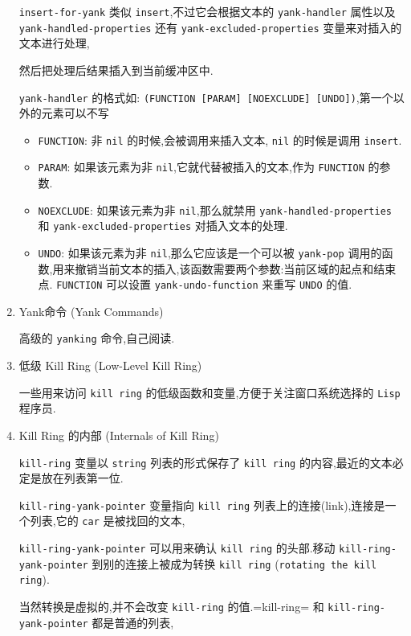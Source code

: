 \documentclass[11pt]{article}
\begin{document}
\begin{enumerate}
\texttt{insert-for-yank} 类似 \texttt{insert},不过它会根据文本的 \texttt{yank-handler} 属性以及 \texttt{yank-handled-properties} 还有 \texttt{yank-excluded-properties} 变量来对插入的文本进行处理,

然后把处理后结果插入到当前缓冲区中.

\texttt{yank-handler} 的格式如: \texttt{(FUNCTION [PARAM] [NOEXCLUDE] [UNDO])},第一个以外的元素可以不写

\begin{itemize}
\item \texttt{FUNCTION}: 非 \texttt{nil} 的时候,会被调用来插入文本, \texttt{nil} 的时候是调用 \texttt{insert}.
\item \texttt{PARAM}: 如果该元素为非 \texttt{nil},它就代替被插入的文本,作为 \texttt{FUNCTION} 的参数.
\item \texttt{NOEXCLUDE}: 如果该元素为非 \texttt{nil},那么就禁用 \texttt{yank-handled-properties} 和 \texttt{yank-excluded-properties} 对插入文本的处理.
\item \texttt{UNDO}: 如果该元素为非 \texttt{nil},那么它应该是一个可以被 \texttt{yank-pop} 调用的函数,用来撤销当前文本的插入,该函数需要两个参数:当前区域的起点和结束点. \texttt{FUNCTION} 可以设置 \texttt{yank-undo-function} 来重写 \texttt{UNDO} 的值.
\end{itemize}


\item Yank命令 (Yank Commands)
\label{sec:orgb18b656}

高级的 \texttt{yanking} 命令,自己阅读.


\item 低级 Kill Ring (Low-Level Kill Ring)
\label{sec:orgc7be33f}

一些用来访问 \texttt{kill ring} 的低级函数和变量,方便于关注窗口系统选择的 \texttt{Lisp} 程序员.


\item Kill Ring 的内部 (Internals of Kill Ring)
\label{sec:org36e3523}

\texttt{kill-ring} 变量以 \texttt{string} 列表的形式保存了 \texttt{kill ring} 的内容,最近的文本必定是放在列表第一位.

\texttt{kill-ring-yank-pointer} 变量指向 \texttt{kill ring} 列表上的连接(link),连接是一个列表,它的 \texttt{car} 是被找回的文本,

\texttt{kill-ring-yank-pointer} 可以用来确认 \texttt{kill ring} 的头部.移动 \texttt{kill-ring-yank-pointer} 到别的连接上被成为转换 \texttt{kill ring} (\texttt{rotating the kill ring}).

当然转换是虚拟的,并不会改变 \texttt{kill-ring} 的值.=kill-ring= 和 \texttt{kill-ring-yank-pointer} 都是普通的列表,


\end{enumerate}
\end{document}
